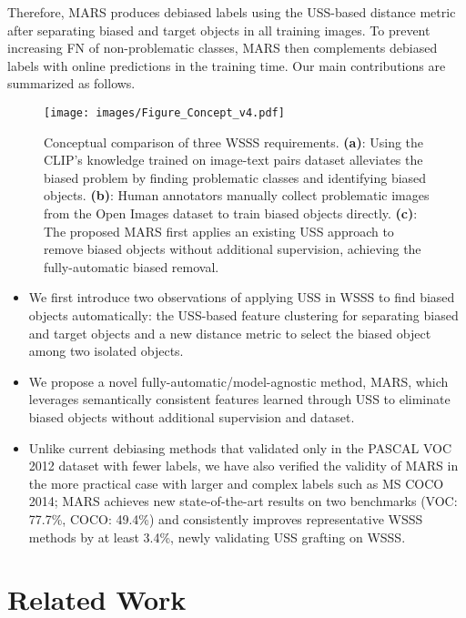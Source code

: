 \documentclass[10pt,twocolumn,letterpaper]{article}
\begin{document}
Therefore, MARS produces debiased labels using the USS-based distance metric after separating biased and target objects in all training images. To prevent increasing FN of non-problematic classes, MARS then complements debiased labels with online predictions in the training time. Our main contributions are summarized as follows. 



\begin{figure*}
  \centering
  \texttt{[image: images/Figure\_Concept\_v4.pdf]}
\caption{
      Conceptual comparison of three WSSS requirements. \textbf{(a)}: Using the CLIP's knowledge trained on image-text pairs dataset alleviates the biased problem by finding problematic classes and identifying biased objects. \textbf{(b)}: Human annotators manually collect problematic images from the Open Images dataset \cite{kuznetsova2020open} to train biased objects directly. \textbf{(c)}: The proposed MARS first applies an existing USS approach to remove biased objects without additional supervision, achieving the fully-automatic biased removal.
  }
  \label{fig:concept}
\vspace{-0.4cm}
\end{figure*}

\begin{itemize}
\item We first introduce two observations of applying USS in WSSS to find biased objects automatically: the USS-based feature clustering for separating biased and target objects and a new distance metric to select the biased object among two isolated objects.
\item We propose a novel fully-automatic/model-agnostic method, MARS, which leverages semantically consistent features learned through USS to eliminate biased objects without additional supervision and dataset.
\item Unlike current debiasing methods \cite{xie2022clims, lee2022weakly} that validated only in the PASCAL VOC 2012 dataset with fewer labels, we have also verified the validity of MARS in the more practical case with larger and complex labels such as MS COCO 2014; MARS achieves new state-of-the-art results on two benchmarks (VOC: 77.7\%, COCO: 49.4\%) and consistently improves representative WSSS methods \cite{ahn2019weakly, wang2020self, lee2021anti, jo2022recurseed} by at least 3.4\%, newly validating USS grafting on WSSS.
\end{itemize}

\section{Related Work}\label{sec:relat}
\end{document}
